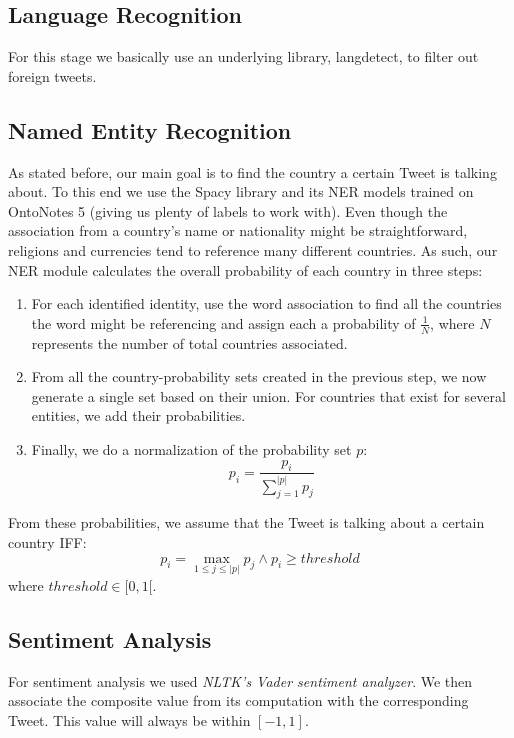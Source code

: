\documentclass[11pt]{article}
\begin{document}
	\subsection{Language Recognition}
	\label{sub:language_recognition}
	For this stage we basically use an underlying library, langdetect, to filter out foreign tweets.
	
	\subsection{Named Entity Recognition}
	\label{sub:named_entity_recognition}
	As stated before, our main goal is to find the country a certain Tweet is talking about. To this end we use the Spacy library and its NER models trained on OntoNotes 5 (giving us plenty of labels to work with). Even though the association from a country's name or nationality might be straightforward, religions and currencies tend to reference many different countries. As such, our NER module calculates the overall probability of each country in three steps:
	\begin{enumerate}
		\item For each identified identity, use the word association to find all the countries the word might be referencing and assign each a probability of $\frac{1}{N}$, where $N$ represents the number of total countries associated.
		\item From all the country-probability sets created in the previous step, we now generate a single set based on their union. For countries that exist for several entities, we add their probabilities.
		\item Finally, we do a normalization of the probability set $p$:
		\begin{equation}
		p_i = \frac{p_{i}}{\sum_{j=1}^{|p|} p_j}
		\end{equation}
	\end{enumerate}
	
	From these probabilities, we assume that the Tweet is talking about a certain country IFF:
	\begin{equation}
	p_{i} = \max_{1 \leq j \leq |p|} p_{j} \wedge p_{i} \ge threshold
	\end{equation}
	where $threshold \in [0, 1[$.
	
	\subsection{Sentiment Analysis}
	\label{sub:sentiment_analysis}
	For sentiment analysis we used \textit{NLTK's Vader sentiment analyzer}. We then associate the composite value from its computation with the corresponding Tweet. This value will always be within $[-1, 1]$.
	
\end{document}

